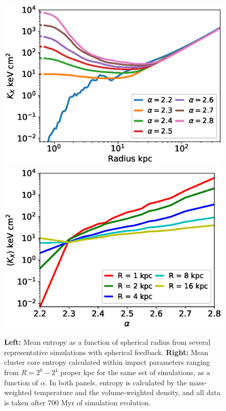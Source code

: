 \documentclass[iop,apjl, twocolappendix]{emulateapj}   %
\begin{document}
\label{sec:results}
\begin{figure}
	\begin{center}
		\includegraphics[width=0.49\linewidth]{figures/spherical/entropyVradius.eps}
		\includegraphics[width=0.49\linewidth]{figures/spherical/entropyValpha.eps}
	\end{center}
	\caption{
		\textbf{Left:}  Mean entropy as a function of spherical radius from
	several representative simulations with spherical feedback.  \textbf{Right:} Mean cluster core
	entropy calculated within impact parameters ranging from $R = 2^0 - 2^4$ proper
	kpc for the same set of simulations, as a function of $\alpha$.  In both
	panels, entropy is calculated by the mass-weighted temperature and the
	volume-weighted density, and all data is taken after 700 Myr of simulation
	evolution.}
\end{figure}
\end{document}
